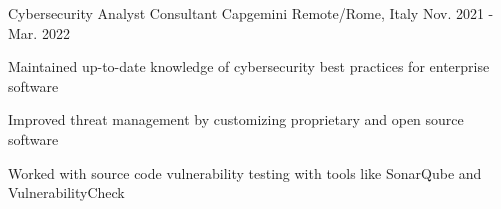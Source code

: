 \begin{cventries}
	\cventry
	{Cybersecurity Analyst Consultant} %
	{Capgemini} %
	{Remote/Rome, Italy} %
	{Nov. 2021 - Mar. 2022} %
	{
		\begin{cvitems} %
			\item {Maintained up-to-date knowledge of cybersecurity best practices for enterprise software}
			\item {Improved threat management by customizing proprietary and open source software}
			\item {Worked with source code vulnerability testing with tools like SonarQube and VulnerabilityCheck}
		\end{cvitems}
	}
\end{cventries}
